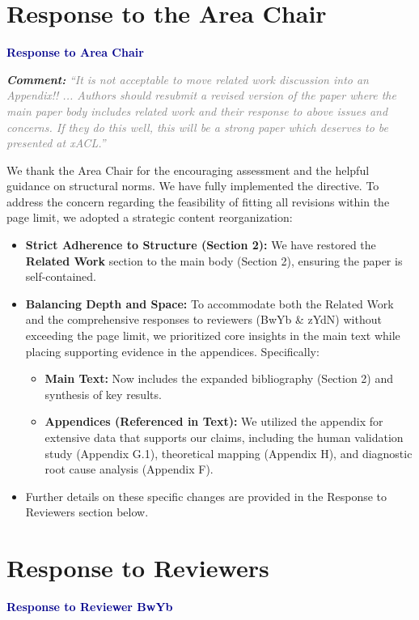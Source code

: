 \documentclass[11pt, a4paper]{article}
\newcommand{\reviewer}[1]{\vspace{0.5cm}\noindent\textbf{\large \textcolor{darkblue}{#1}}}
\newcommand{\comment}[1]{%
    \par\vspace{1em}%
    \noindent\textbf{\textit{Comment:}} \textit{\textcolor{gray}{#1}}%
}
\begin{document}
\section{Response to the Area Chair}

\reviewer{Response to Area Chair}

\comment{``It is not acceptable to move related work discussion into an Appendix!! ... Authors should resubmit a revised version of the paper where the main paper body includes related work and their response to above issues and concerns. If they do this well, this will be a strong paper which deserves to be presented at xACL.''}

We thank the Area Chair for the encouraging assessment and the helpful guidance on structural norms. We have fully implemented the directive. To address the concern regarding the feasibility of fitting all revisions within the page limit, we adopted a strategic content reorganization:

\begin{itemize}
    \item \textbf{Strict Adherence to Structure (Section 2):} We have restored the \textbf{Related Work} section to the main body (Section 2), ensuring the paper is self-contained.
    
    \item \textbf{Balancing Depth and Space:} To accommodate both the Related Work and the comprehensive responses to reviewers (BwYb \& zYdN) without exceeding the page limit, we prioritized core insights in the main text while placing supporting evidence in the appendices.
    Specifically:
    \begin{itemize}
        \item \textbf{Main Text:} Now includes the expanded bibliography (Section 2) and synthesis of key results.
        \item \textbf{Appendices (Referenced in Text):} We utilized the appendix for extensive data that supports our claims, including the human validation study (Appendix G.1), theoretical mapping (Appendix H), and diagnostic root cause analysis (Appendix F).
    \end{itemize}

    \item Further details on these specific changes are provided in the Response to Reviewers section below.
\end{itemize}


\section{Response to Reviewers}
\reviewer{Response to Reviewer BwYb}
\end{document}
